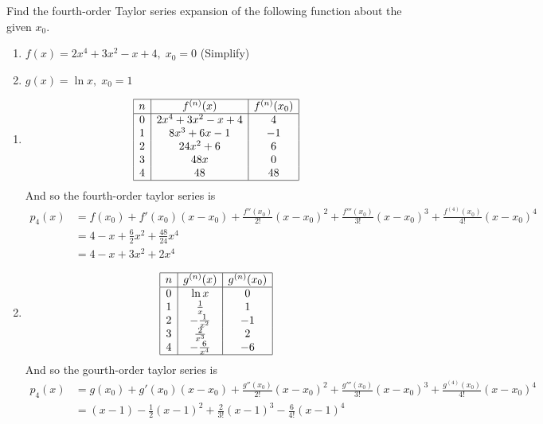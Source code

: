 \documentclass{hwset}
\begin{document}
\begin{problem}[4.]
	Find the fourth-order Taylor series expansion of the following function about
	the given $x_0$.
	\begin{enumerate}
		\item $f(x) = 2x^4 + 3x^2 - x + 4,\; x_0 = 0$ (Simplify)
		\item $g(x) = \ln x,\; x_0 = 1$
	\end{enumerate}
\end{problem}

\begin{enumerate}
	\item \begin{solution}
			\begin{equation*}
				\begin{array}{|c|c|c|}
					\hline
					n & f^{(n)}(x) & f^{(n)}(x_0) \\
					\hline
					0 & 2x^4+3x^2-x+4 & 4 \\
					1 & 8x^3+6x-1 & -1 \\
					2 & 24x^2+6 & 6 \\
					3 & 48x & 0 \\
					4 & 48 & 48 \\
					\hline
				\end{array}
			\end{equation*}
			And so the fourth-order taylor series is
			\begin{align*}
				p_4(x) &= f(x_0) + f'(x_0)(x-x_0) + \frac{f''(x_0)}{2!}(x-x_0)^2 +
					\frac{f'''(x_0)}{3!}(x-x_0)^3 + \frac{f^{(4)}(x_0)}{4!}(x-x_0)^4 \\
				&= 4 - x + \frac{6}{2} x^2 + \frac{48}{24}x^4 \\
				&= \boxed{4 - x + 3 x^2 + 2 x^4}
			\end{align*}
		\end{solution}
	\item \begin{solution}
			\begin{equation*}
				\begin{array}{|c|c|c|}
					\hline
					n & g^{(n)}(x) & g^{(n)}(x_0) \\
					\hline
					0 & \ln x & 0 \\
					1 & \frac{1}{x} & 1 \\
					2 & -\frac{1}{x^2} & -1 \\
					3 & \frac{2}{x^3} & 2 \\
					4 & -\frac{6}{x^4} & -6 \\
					\hline
				\end{array}
			\end{equation*}
			And so the gourth-order taylor series is
			\begin{align*}
				p_4(x) &= g(x_0) + g'(x_0)(x-x_0) + \frac{g''(x_0)}{2!}(x-x_0)^2 +
					\frac{g'''(x_0)}{3!}(x-x_0)^3 + \frac{g^{(4)}(x_0)}{4!}(x-x_0)^4 \\
				&= \boxed{(x-1) - \frac{1}{2} (x-1)^2 + \frac{2}{3!}(x-1)^3 -
				\frac{6}{4!}(x-1)^4} 
			\end{align*}
		\end{solution}
\end{enumerate}
\end{document}
